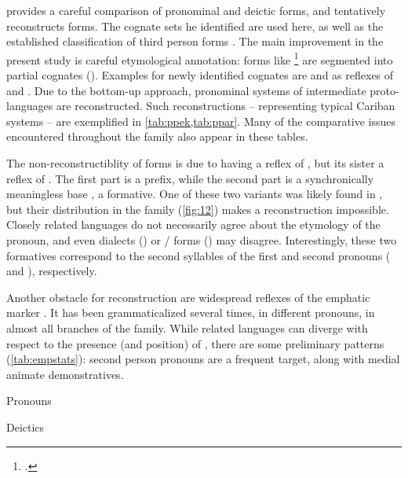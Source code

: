 \documentclass[a4paper]{article}
\begin{document}
\textcite{meira2002first} provides a careful comparison of pronominal and deictic forms, and tentatively reconstructs \PC forms.
The cognate sets he identified are used here, as well as the established classification of third person forms \parencites[265--266]{meira2002first}[54]{derbyshire1999carib}.
The main improvement in the present study is careful etymological annotation: forms like \wayana {} \footnote{\glossingAbbrevsComma.} \parencites[180]{wayanatavares2005} are segmented into partial cognates ().
Examples for newly identified cognates are \ikpeng {}  and   \parencite[120]{ikpengpacheco2001} as reflexes of \PC {} and .
%
Due to the bottom-up approach, pronominal systems of intermediate proto-languages are reconstructed.
Such reconstructions -- representing typical Cariban systems -- are exemplified in \cref{tab:ppek,tab:ppar}.
Many of the comparative issues encountered throughout the family also appear in these tables.


	The non-reconstructiblity of \PPar {} forms is due to \PWai having a reflex of , but its sister \kaxui a reflex of .
	The first part is a  prefix, while the second part is a synchronically meaningless base \parencite[261]{meira2002first}, a formative.
	One of these two variants was likely found in \PC, but their distribution in the family (\cref{fig:12}) makes a reconstruction impossible.
	Closely related languages do not necessarily agree about the etymology of the  pronoun, and even dialects (\kalina) or / forms (\maqui) may disagree.
	Interestingly, these two formatives correspond to the second syllables of the first and second pronouns ( and ), respectively.
	
	Another obstacle for reconstruction are widespread reflexes of the emphatic marker  \parencite[258]{meira2002first}.
	It has been grammaticalized several times, in different pronouns, in almost all branches of the family.
	While related languages can diverge with respect to the presence (and position) of , there are some preliminary patterns (\cref{tab:empstats}): second person pronouns are a frequent target, along with medial animate demonstratives.

	\begin{table}[p]
	\caption{\PPek}\label{tab:ppek}
	\begin{subtable}[t]{.5\linewidth}\centering
		\caption{Pronouns}\label{tab:ppekpro}
		{}
	\end{subtable}%
	\begin{subtable}[t]{.5\linewidth}\centering
		\caption{Deictics}\label{tab:ppekdem}
		{}
	\end{subtable}
\end{table}
\end{document}
